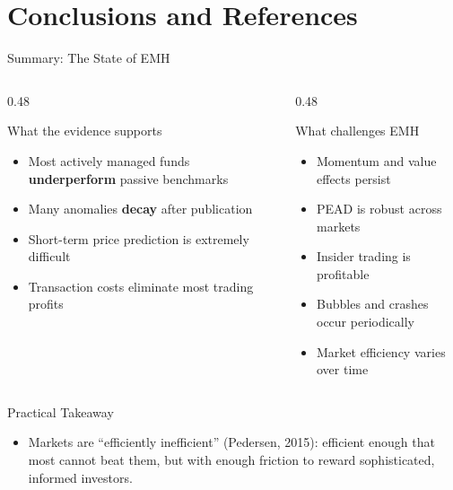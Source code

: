 \documentclass[9pt, aspectratio=169, t]{beamer}
\theoremstyle{definition}
\newenvironment{cminipage}[1]{%
    \par\noindent\hfill\begin{minipage}{#1}\ignorespaces
}{%
    \end{minipage}\hfill\null\par
}
\begin{document}
\section{Conclusions and References}

\begin{frame}{Summary: The State of EMH}
\begin{cminipage}{0.95\textwidth}
\begin{columns}[T]
\begin{column}{0.48\textwidth}
\begin{block}{What the evidence supports}
\begin{itemize}\setlength{\itemsep}{0pt}
    \item Most actively managed funds \textbf{underperform} passive benchmarks
    \item Many anomalies \textbf{decay} after publication
    \item Short-term price prediction is extremely difficult
    \item Transaction costs eliminate most trading profits
\end{itemize}
\end{block}
\end{column}
\begin{column}{0.48\textwidth}
\begin{block}{What challenges EMH}
\begin{itemize}\setlength{\itemsep}{0pt}
    \item Momentum and value effects persist
    \item PEAD is robust across markets
    \item Insider trading is profitable
    \item Bubbles and crashes occur periodically
    \item Market efficiency varies over time
\end{itemize}
\end{block}
\end{column}
\end{columns}

\vspace{0.3cm}
\begin{alertblock}{Practical Takeaway}
\begin{itemize}\setlength{\itemsep}{0pt}
    \item Markets are ``efficiently inefficient'' (Pedersen, 2015): efficient enough that most cannot beat them, but with enough friction to reward sophisticated, informed investors.
\end{itemize}
\end{alertblock}
\end{cminipage}
\end{frame}
\end{document}
